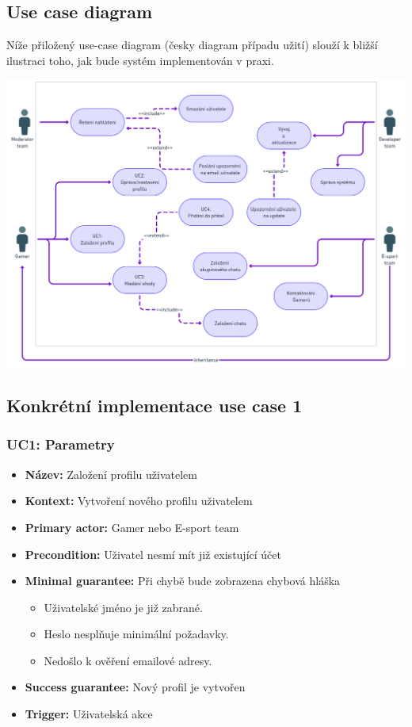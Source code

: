 \documentclass[czech,12pt,a4paper,titlepage]{article}
\begin{document}
\subsection{Use case diagram}

Níže přiložený use-case diagram (česky diagram případu užití) slouží k bližší ilustraci toho,
jak bude systém implementován v praxi.

\bigskip
\bigskip
\bigskip
\bigskip
\bigskip
\bigskip


\includegraphics[width=1\textwidth, center]{UC_diagram.png}

\clearpage

\subsection{Konkrétní implementace use case 1}

\subsubsection{UC1: Parametry}

\begin{itemize}
    \item \textbf{Název:} Založení profilu uživatelem
    \item \textbf{Kontext:} Vytvoření nového profilu uživatelem
    \item \textbf{Primary actor:} Gamer nebo E-sport team
    \item \textbf{Precondition:} Uživatel nesmí mít již existující účet
    \item \textbf{Minimal guarantee:} Při chybě bude zobrazena chybová hláška
          \begin{itemize}
              \item Uživatelské jméno je již zabrané.
              \item Heslo nesplňuje minimální požadavky.
              \item Nedošlo k ověření emailové adresy.
          \end{itemize}
    \item \textbf{Success guarantee:} Nový profil je vytvořen
    \item \textbf{Trigger:} Uživatelská akce
\end{itemize}
\end{document}
